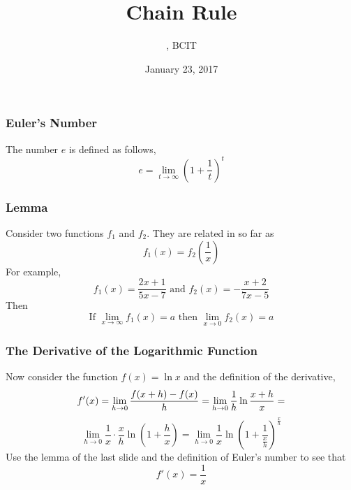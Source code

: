 \documentclass[xcolor=dvipsnames]{beamer}
\title{Chain Rule}
\subtitle{{\CourseNumber}, BCIT}
\author{\CourseName}
\date{January 23, 2017}
\begin{document}
\begin{frame}
  \titlepage
\end{frame}

\begin{frame}
  \frametitle{Euler's Number}
The number $e$ is defined as follows,
\begin{equation}
  \label{eq:ciedaeme}
  e=\lim_{t\rightarrow\infty}\left(1+\frac{1}{t}\right)^{t}
\end{equation}
\end{frame}

\begin{frame}
  \frametitle{Lemma}
Consider two functions $f_{1}$ and $f_{2}$. They are related in so far
as
\begin{equation}
  \label{eq:ohquailo}
  f_{1}(x)=f_{2}\left(\frac{1}{x}\right)
\end{equation}
For example,
\begin{equation}
  \label{eq:seemaxah}
  f_{1}(x)=\frac{2x+1}{5x-7}\mbox{ and }f_{2}(x)=-\frac{x+2}{7x-5}
\end{equation}
Then
\begin{equation}
  \label{eq:iebieluk}
  \mbox{If }\lim_{x\rightarrow\infty}f_{1}(x)=a\mbox{ then }\lim_{x\rightarrow{}0}f_{2}(x)=a
\end{equation}
\end{frame}

\begin{frame}
  \frametitle{The Derivative of the Logarithmic Function}
Now consider the function $f(x)=\ln{}x$ and the definition of the
derivative,
\begin{equation}
  \label{eq:eeghaphe}
  f'(x)=\lim_{h\rightarrow{}0}\frac{f(x+h)-f(x)}{h}=\lim_{h\rightarrow{}0}\frac{1}{h}\ln\frac{x+h}{x}=\notag
\end{equation}
\begin{equation}
  \label{eq:quanoefe}
  \lim_{h\rightarrow{}0}\frac{1}{x}\cdot\frac{x}{h}\ln\left(1+\frac{h}{x}\right)=\lim_{h\rightarrow{}0}\frac{1}{x}\ln\left(1+\frac{1}{\frac{x}{h}}\right)^{\frac{x}{h}}
\end{equation}
Use the lemma of the last slide and the definition of Euler's number to see that
\begin{equation}
  \label{eq:oozeexei}
  f'(x)=\frac{1}{x}
\end{equation}
\end{frame}
\end{document}
